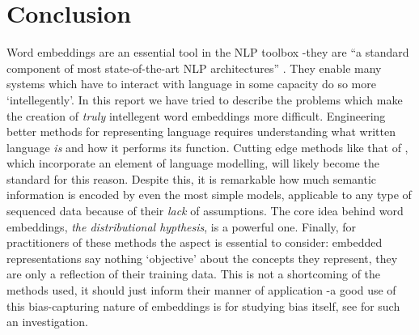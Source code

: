 \documentclass{ucetd}
\begin{document}
\chapter*{Conclusion}\label{chap:conclusion}
Word embeddings are an essential tool in the NLP toolbox -they are ``a standard component of most state-of-the-art NLP architectures'' \parencite{peters18-deep-contex-word-repres}. They enable many systems which have to interact with language in some capacity do so more `intellegently'. In this report we have tried to describe the problems which make the creation of \emph{truly} intellegent word embeddings more difficult. Engineering better methods for representing language requires understanding what written language \emph{is} and how it performs its function. Cutting edge methods like that of \textcite{devlin-etal-2019-bert}, which incorporate an element of language modelling, will likely become the standard for this reason. Despite this, it is remarkable how much semantic information is encoded by even the most simple models, applicable to any type of sequenced data because of their \emph{lack} of assumptions. The core idea behind word embeddings, \emph{the distributional hypthesis}, is a powerful one. Finally, for practitioners of these methods the  aspect is essential to consider: embedded representations say nothing `objective' about the concepts they represent, they are only a reflection of their training data. This is not a shortcoming of the methods used, it should just inform their manner of application -a good use of this bias-capturing nature of embeddings is for studying bias itself, see \parencite{garg-2018-word-embeddings-quantify} for such an investigation.

\makebibliography
\end{document}
